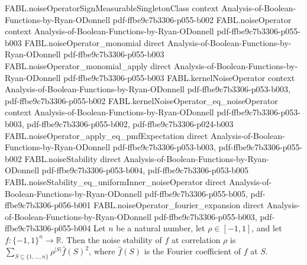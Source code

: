 \begin{theorem}
\proofstep
  {FABL.noiseOperatorSignMeasurableSingletonClass}
  {context}
  {Analysis-of-Boolean-Functions-by-Ryan-ODonnell}
  {pdf-ffbe9c7b3306-p055-b002}
\proofstep
  {FABL.noiseOperator}
  {context}
  {Analysis-of-Boolean-Functions-by-Ryan-ODonnell}
  {pdf-ffbe9c7b3306-p055-b003}
\proofstep
  {FABL.noiseOperator_monomial}
  {direct}
  {Analysis-of-Boolean-Functions-by-Ryan-ODonnell}
  {pdf-ffbe9c7b3306-p055-b003}
\proofstep
  {FABL.noiseOperator_monomial_apply}
  {direct}
  {Analysis-of-Boolean-Functions-by-Ryan-ODonnell}
  {pdf-ffbe9c7b3306-p055-b003}
\proofstep
  {FABL.kernelNoiseOperator}
  {context}
  {Analysis-of-Boolean-Functions-by-Ryan-ODonnell}
  {pdf-ffbe9c7b3306-p053-b003,
    pdf-ffbe9c7b3306-p055-b002}
\proofstep
  {FABL.kernelNoiseOperator_eq_noiseOperator}
  {context}
  {Analysis-of-Boolean-Functions-by-Ryan-ODonnell}
  {pdf-ffbe9c7b3306-p053-b003,
    pdf-ffbe9c7b3306-p055-b002,
    pdf-ffbe9c7b3306-p024-b003}
\proofstep
  {FABL.noiseOperator_apply_eq_pmfExpectation}
  {direct}
  {Analysis-of-Boolean-Functions-by-Ryan-ODonnell}
  {pdf-ffbe9c7b3306-p053-b003,
    pdf-ffbe9c7b3306-p055-b002}
\proofstep
  {FABL.noiseStability}
  {direct}
  {Analysis-of-Boolean-Functions-by-Ryan-ODonnell}
  {pdf-ffbe9c7b3306-p053-b004,
    pdf-ffbe9c7b3306-p053-b005}
\proofstep
  {FABL.noiseStability_eq_uniformInner_noiseOperator}
  {direct}
  {Analysis-of-Boolean-Functions-by-Ryan-ODonnell}
  {pdf-ffbe9c7b3306-p055-b005,
    pdf-ffbe9c7b3306-p056-b001}
\proofstep
  {FABL.noiseOperator_fourier_expansion}
  {direct}
  {Analysis-of-Boolean-Functions-by-Ryan-ODonnell}
  {pdf-ffbe9c7b3306-p055-b003,
    pdf-ffbe9c7b3306-p055-b004}
Let $n$ be a natural number, let $\rho\in[-1,1]$, and let $f:\{−1,1\}^n\to\mathbb{R}$.
Then the noise stability of $f$ at correlation $\rho$ is
$\displaystyle\sum_{S\subseteq\{1,\ldots,n\}}\rho^{|S|}\widehat f(S)^2$, where $\widehat
f(S)$ is the Fourier coefficient of $f$ at $S$.
\end{theorem}

